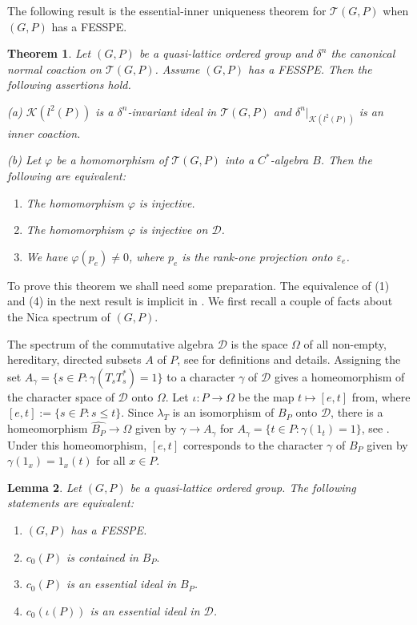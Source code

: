 \documentclass[12pt]{amsart}
\theoremstyle{plain}
\newtheorem{theorem}{Theorem}[section]
\newtheorem{lemma}[theorem]{Lemma}
\theoremstyle{remark}
\theoremstyle{definition}
\numberwithin{equation}{section}
\theoremstyle{plain}
\theoremstyle{definition}
\theoremstyle{remark}
\begin{document}
The following result is the essential-inner uniqueness theorem for ${\mathcal T}(G, P)$ when $(G, P)$ has a {FESSPE}.

\begin{theorem}\label{thm:describe-inner-Nica-alg} Let $(G, P)$ be a quasi-lattice ordered group and  $\delta^{n}$
 the canonical normal coaction on ${\mathcal T}(G, P)$. Assume $(G, P)$ has a {FESSPE}. Then the following assertions hold.

 \textnormal{(a)} ${\mathcal K}(l^2(P))$ is a $\delta^{n}$-invariant ideal in ${\mathcal T}(G, P)$ and $\delta^{n}\vert_{{\mathcal K}(l^2(P))}$ is an inner coaction.

 \textnormal{(b)} Let $\varphi$ be a homomorphism of ${\mathcal T}(G,P)$ into a $C^*$-algebra $B$.
Then the following are equivalent:
\begin{enumerate}
\item\label{it:phi-inj} The homomorphism $\varphi$ is injective.
\item\label{it:phi-inj-fix} The homomorphism $\varphi$ is injective on ${\mathcal D}$.
\item\label{it:phi-inj-chie} We have $\varphi(p_e)\not=0$, where $p_e$ is the rank-one projection onto $\varepsilon_e$.
\end{enumerate}
\end{theorem}

To prove this theorem we shall need some preparation. The equivalence of (1) and (4) in the next result is implicit in \cite[Proposition 6.3]{N}.
We first recall a couple of facts about the Nica spectrum of $(G, P)$.

The spectrum of the commutative algebra ${\mathcal D}$  is the space $\Omega$ of all non-empty, hereditary, directed
subsets $A$ of $P$, see \cite[\S6]{N} for definitions and details. Assigning the
set $A_\gamma=\{s\in P: \gamma(T_sT_s^*)=1\}$ to a character $\gamma$ of ${\mathcal D}$ gives a homeomorphism of the character space of
${\mathcal D}$ onto $\Omega$. Let
$\iota:P\to \Omega$ be the map $t\mapsto [e,t]$ from\cite[\S 6.3, Remark 1]{N}, where $[e,t]:=\{s\in P: s\leq t\}$.
Since $\lambda_T$ is an isomorphism of $B_P$ onto ${\mathcal D}$, there is a homeomorphism
$\widehat{B_P}\to \Omega$ given by $\gamma\to A_\gamma$ for
$A_\gamma=\{t\in P: \gamma(1_t)=1\}$, see \cite{Lac1}. Under this homeomorphism, $[e,t]$ corresponds to the character $\gamma$
of $B_P$  given by $\gamma(1_x)=1_x(t)$ for all $x\in P$.

\begin{lemma}\label{lem:essential-ideal}
Let $(G, P)$ be a quasi-lattice ordered group. The following statements are equivalent:
\begin{enumerate}
\item\label{it:pair-to-ideal1} $(G, P)$ has a {FESSPE}.
\item\label{it:pair-to-ideal2} $c_0(P)$ is contained in $B_P.$
\item\label{it:pair-to-ideal3} $c_0(P)$ is an essential ideal in $B_P$.
\item\label{it:pair-to-ideal4} $c_0(\iota(P))$ is an essential ideal in ${\mathcal D}$.
\end{enumerate}
\end{lemma}
\end{document}
